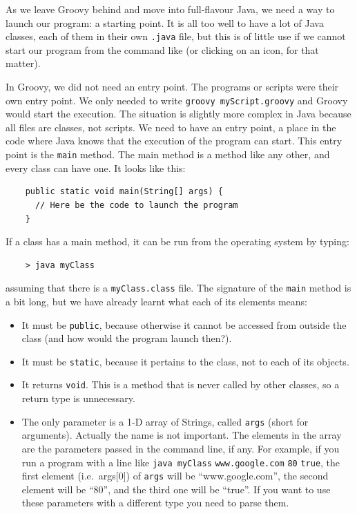 As we leave Groovy behind and move into full-flavour Java, we need a
way to launch our program: a starting point. It is all too well to
have a lot of Java classes, each of them in their own \verb+.java+
file, but this is of little use if we cannot start our program from
the command like (or clicking on an icon, for that matter). 

In Groovy, we did not need an entry point. The programs or scripts
were their own entry point. We only needed to 
write \verb+groovy myScript.groovy+ and Groovy would
start the execution. The situation is slightly more complex in Java
because all files are classes, not scripts. We need to have an entry
point, a place in the code where Java knows that the execution of the
program can start. This entry point is the \verb+main+ method. The
main method is a method like any other, and every class can have
one. It looks like this:

\begin{verbatim}
    public static void main(String[] args) {
      // Here be the code to launch the program
    }
\end{verbatim}

If a class has a main method, it can be run from the operating system
by typing: 

\begin{verbatim}
    > java myClass
\end{verbatim}

assuming that there is a \verb+myClass.class+ file. The 
signature of the \verb+main+ method is a bit long, but we have
already learnt what each of its elements means: 

\begin{itemize}
\item It must be \verb+public+, because otherwise it cannot be
  accessed from outside the class (and how would the program launch
  then?).
\item It must be \verb+static+, because it pertains to the class, not
  to each of its objects.
\item It returns \verb+void+. This is a method that is never called by
  other classes, so a return type is unnecessary.
\item The only parameter is a 1-D array of Strings, called \verb+args+
  (short for arguments). Actually the name is not important. The
  elements in the array are the parameters passed in the command line,
  if any. For example, if you run a program with a line like
  \verb+java myClass+ \verb+www.google.com+ \verb+80+ \verb+true+, 
  the first element
  (i.e.~args[0]) of \verb+args+ will be ``www.google.com'', the second
  element will be ``80'', and the third one will be ``true''. If you
  want to use these parameters with a different type you need to parse
  them. 
\end{itemize}

